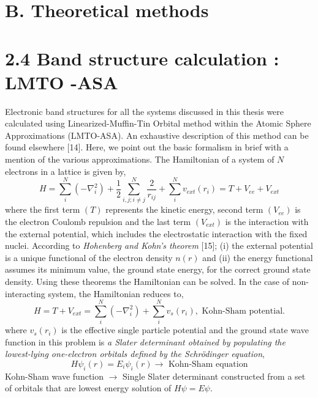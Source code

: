 \section*{B. Theoretical methods}

\section*{2.4 Band structure calculation : LMTO -ASA}

Electronic band structures for all the systems discussed in this thesis were calculated using Linearized-Muffin-Tin Orbital method within the Atomic Sphere Approximations (LMTO-ASA). An exhaustive description of this method can be found elsewhere [14]. Here, we point out the basic formalism in brief with a mention of the various approximations. The Hamiltonian of a system of $N$ electrons in a lattice is given by,
\begin{equation*}
H=\sum\limits^{N}_{i}(-\nabla^{2}_{i})+\frac{1}{2}\sum\limits^{N}_{i,j;i\neq j}\dfrac{2}{r_{ij}}+\sum\limits^{N}_{i}v_{ext}(r_{i})=T+V_{ee}+V_{ext}\tag{2.10}
\end{equation*}
where the first term $(T)$ represents the kinetic energy, second term $(V_{ee})$ is the electron Coulomb repulsion and the last term $(V_{ext})$ is the interaction with the external potential, which includes the electrostatic interaction with the fixed nuclei. According to {\em Hohenberg and Kohn's theorem} [15]; (i) the external potential is a unique functional of the electron density $n(r)$ and (ii) the energy functional assumes its minimum value, the ground state energy, for the correct ground state density. Using these theorems the Hamiltonian can be solved. In the case of non-interacting system, the Hamiltonian reduces to,
\begin{equation*}
H=T+V_{ext}=\sum\limits^{N}_{i}(-\nabla^{2}_{i})+\sum\limits^{N}_{i}v_{s}(r_{i}), \text{ Kohn-Sham potential.}
\end{equation*}
where $v_{s}(r_{i})$ is the effective single particle potential and the ground state wave function in this problem is {\em a Slater determinant obtained by populating the lowest-lying one-electron orbitals defined by the Schr\"odinger equation},
$$
H\psi_{i}(r)=E_{i}\psi_{i}(r)\to \text{ Kohn-Sham equation}
$$
Kohn-Sham wave function $\to$ Single Slater determinant constructed from a set of orbitals that are lowest energy solution of $H\psi=E\psi$.

